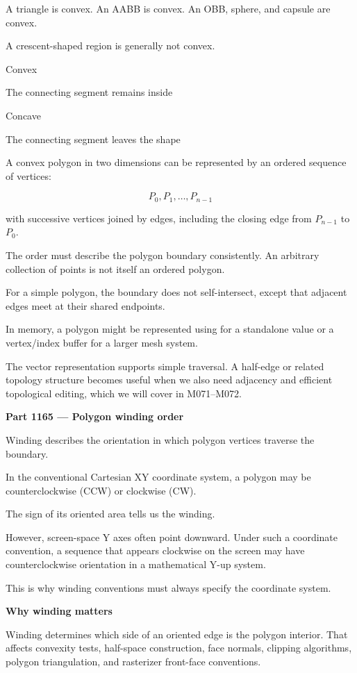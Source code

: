 A triangle is convex. An AABB is convex. An OBB, sphere, and capsule are convex.

A crescent-shaped region is generally not convex.

Convex

The connecting segment remains inside

Concave

The connecting segment leaves the shape

A convex polygon in two dimensions can be represented by an ordered sequence of vertices:

\[
P_0,P_1,\ldots,P_{n-1}
\]

with successive vertices joined by edges, including the closing edge from \(P_{n-1}\) to \(P_0\).

The order must describe the polygon boundary consistently. An arbitrary collection of points is not itself an ordered polygon.

For a simple polygon, the boundary does not self-intersect, except that adjacent edges meet at their shared endpoints.

In memory, a polygon might be represented using  for a standalone value or a vertex/index buffer for a larger mesh system.

The vector representation supports simple traversal. A half-edge or related topology structure becomes useful when we also need adjacency and efficient topological editing, which we will cover in M071--M072.

\textbf{Part 1165 --- Polygon winding order}

Winding describes the orientation in which polygon vertices traverse the boundary.

In the conventional Cartesian XY coordinate system, a polygon may be counterclockwise (CCW) or clockwise (CW).

The sign of its oriented area tells us the winding.

However, screen-space Y axes often point downward. Under such a coordinate convention, a sequence that appears clockwise on the screen may have counterclockwise orientation in a mathematical Y-up system.

This is why winding conventions must always specify the coordinate system.

\textbf{Why winding matters}

Winding determines which side of an oriented edge is the polygon interior. That affects convexity tests, half-space construction, face normals, clipping algorithms, polygon triangulation, and rasterizer front-face conventions.

